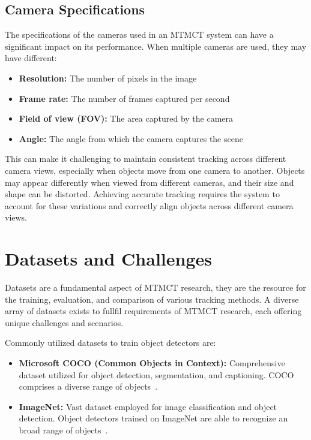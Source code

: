 \subsection{Camera Specifications}\label{subsec:camera_specification}
The specifications of the cameras used in an MTMCT system can have a significant impact on its performance. When multiple cameras are used, they may have different:

\begin{itemize}
    \item \textbf{Resolution:} The number of pixels in the image
    \item \textbf{Frame rate:} The number of frames captured per second
    \item \textbf{Field of view (FOV):} The area captured by the camera
    \item \textbf{Angle:} The angle from which the camera captures the scene
\end{itemize}

This can make it challenging to maintain consistent tracking across different camera views, especially when objects move from one camera to another. Objects may appear differently when viewed from different cameras, and their size and shape can be distorted. Achieving accurate tracking requires the system to account for these variations and correctly align objects across different camera views.

\section{Datasets and Challenges}\label{sec:datasets_and_challenges}
Datasets are a fundamental aspect of MTMCT research, they are the resource for the training, evaluation, and comparison of various tracking methods. A diverse array of datasets exists to fullfil requirements of MTMCT research, each offering unique challenges and scenarios.

Commonly utilized datasets to train object detectors are:

\begin{itemize}
    \item \textbf{Microsoft COCO (Common Objects in Context):} Comprehensive dataset utilized for object detection, segmentation, and captioning. COCO comprises a diverse range of objects~\cite{Lin14}.
    \item \textbf{ImageNet:} Vast dataset employed for image classification and object detection. Object detectors trained on ImageNet are able to recognize an broad range of objects~\cite{Deng09}.
\end{itemize}

